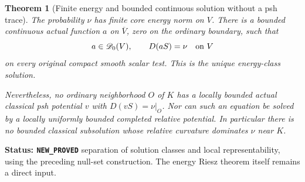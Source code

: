 \documentclass[11pt,a4paper]{article}
\numberwithin{equation}{section}
\newtheorem{theorem}{Theorem}[section]
\theoremstyle{definition}
\theoremstyle{remark}
\begin{document}
\begin{theorem}[Finite energy and bounded continuous solution without a psh trace]
\label{thm:r6-bounded-energy-no-local-psh}
The probability $\nu$ has finite core energy norm on $V$. There is
a bounded continuous actual function $a$ on $\overline V$, zero on
the ordinary boundary, such that
\[
                  a\in\mathscr D_0(V),\qquad
                  D(aS)=\nu\quad\hbox{on }V
\]
on every original compact smooth scalar test. This is the unique
energy-class solution.

Nevertheless, no ordinary neighborhood $O$ of $K$ has a locally
bounded actual classical psh potential $v$ with $D(vS)=\nu|_O$.
Nor can such an equation be solved by a locally uniformly bounded
completed relative potential. In particular there is no bounded
classical subsolution whose relative curvature dominates $\nu$ near
$K$.
\end{theorem}

\noindent\textbf{Status: \texttt{NEW\_PROVED}} separation of solution
classes and local representability, using the preceding null-set
construction. The energy Riesz theorem itself remains a direct input.
\end{document}
